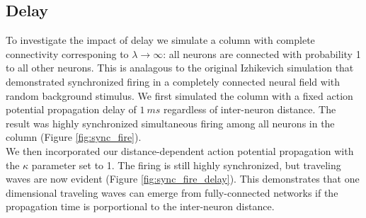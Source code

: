 \documentclass[a4paper,11pt]{article}
\begin{document}
\subsection{Delay} \label{sub:delay}
To investigate the impact of delay we simulate a column with complete connectivity corresponing to $\lambda \rightarrow \infty$: all neurons are connected with probability 1 to all other neurons.
This is analagous to the original Izhikevich simulation \cite{izzy_code} that demonstrated synchronized firing in a completely connected neural field with random background stimulus.
We first simulated the column with a fixed action potential propagation delay of $1~ms$ regardless of inter-neuron distance.
The result was highly synchronized simultaneous firing among all neurons in the column (Figure \ref{fig:sync_fire}). \\ 
We then incorporated our distance-dependent action potential propagation with the $\kappa$ parameter set to 1.
The firing is still highly synchronized, but traveling waves are now evident (Figure \ref{fig:sync_fire_delay}).
This demonstrates that one dimensional traveling waves can emerge from fully-connected networks if the propagation time is porportional to the inter-neuron distance.
\end{document}
